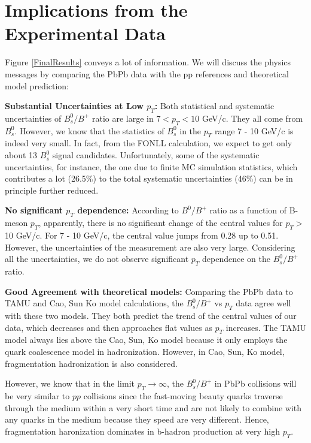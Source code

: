 \section{Implications from the Experimental Data}

Figure \ref{FinalResults} conveys a lot of information. We will discuss the physics messages by comparing the PbPb data with the pp references and theoretical model prediction:



\textbf{Substantial Uncertainties at Low $p_T$:} Both statistical and systematic uncertainties of $B^0_s/B^+$ ratio are large in $7 < p_T < 10$ GeV/c. They all come from $B^0_s$. However, we know that the statistics of $B^0_s$ in the $p_T$ range 7 - 10 GeV/c is indeed very small. In fact, from the FONLL calculation, we expect to get only about 13 $B^0_s$ signal candidates. Unfortunately, some of the systematic uncertainties, for instance, the one due to finite MC simulation statistics, which contributes a lot (26.5\%) to the total systematic uncertainties (46\%) can be in principle further reduced. 

\textbf{No significant $p_T$ dependence:} According to $B^0/B^+$ ratio as a function of B-meson $p_T$, apparently, there is no significant change of the central values for $p_T >$10 GeV/c. For 7 - 10 GeV/c, the central value jumps from 0.28 up to 0.51. However, the uncertainties of the measurement are also very large. Considering all the uncertainties, we do not observe significant $p_T$ dependence on the $B^0_s/B^+$ ratio.

\textbf{Good Agreement with theoretical models:} Comparing the PbPb data to TAMU and Cao, Sun Ko model calculations, the $B^0_s/B^+$ vs $p_T$ data agree well with these two models. They both predict the trend of the central values of our data, which decreases and then approaches flat values as $p_T$ increases. The TAMU model always lies above the Cao, Sun, Ko model because it only employs the quark coalescence model in hadronization. However, in Cao, Sun, Ko model, fragmentation hadronization is also considered. 

However, we know that in the limit $p_T \rightarrow \infty$, the $B^0_s/B^+$ in PbPb collisions will be very similar to $pp$ collisions since the fast-moving beauty quarks traverse through the medium within a very short time and are not likely to combine with any quarks in the medium because they speed are very different. Hence, fragmentation haronization dominates in b-hadron production at very high $p_T$. 

